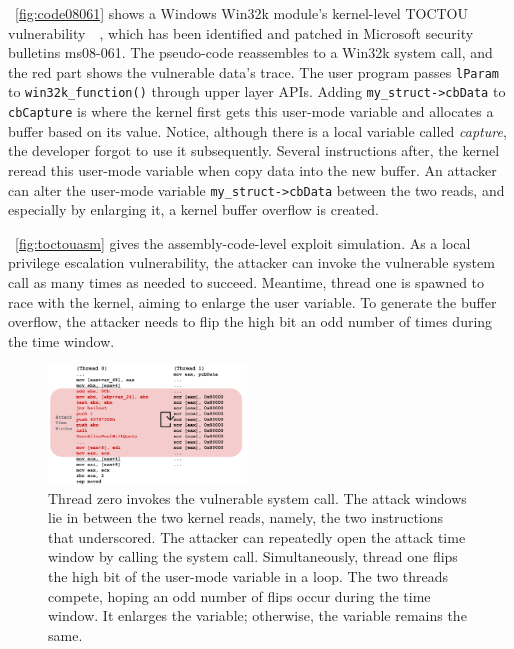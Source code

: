 ~\autoref{fig:code08061} shows a Windows Win32k module's kernel-level TOCTOU vulnerability~\cite{jurczyk2013identifying}~\cite{ms08061}, which has been identified and patched in Microsoft security bulletins ms08-061. The pseudo-code reassembles to a Win32k system call, and the red part shows the vulnerable data's trace.  The user program passes \texttt{lParam} to \texttt{win32k\_function()} through upper layer APIs.  Adding \texttt{my\_struct->cbData} to \texttt{cbCapture} is where the kernel first gets this user-mode variable and allocates a buffer based on its value. Notice, although there is a local variable called \textit{capture}, the developer forgot to use it subsequently.  Several instructions after, the kernel reread this user-mode variable when copy data into the new buffer.  An attacker can alter the user-mode variable \texttt{my\_struct->cbData} between the two reads, and especially by enlarging it, a kernel buffer overflow is created.


~\autoref{fig:toctouasm} gives the assembly-code-level exploit simulation.  As a local privilege escalation vulnerability, the attacker can invoke the vulnerable system call as many times as needed to succeed. Meantime, thread one is spawned to race with the kernel, aiming to enlarge the user variable. To generate the buffer overflow, the attacker needs to flip the high bit an odd number of times during the time window.


\begin{figure}[ht]
  \includegraphics[width=0.47\textwidth]{figures/toctouasm3}
  \centering
  \caption{Thread zero invokes the vulnerable system call. The attack windows lie in between the two kernel reads, namely, the two instructions that underscored. The attacker can repeatedly open the attack time window by calling the system call. Simultaneously, thread one flips the high bit of the user-mode variable in a loop. The two threads compete, hoping an odd number of flips occur during the time window. It enlarges the variable; otherwise, the variable remains the same.}
  \label{fig:toctouasm}
\end{figure}


